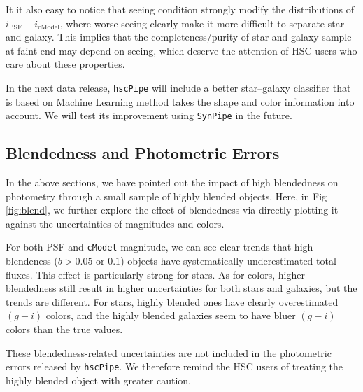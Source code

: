 \documentclass[useamsfonts]{pasj01}
\def\hscpipe{\texttt{hscPipe}}
\def\synpipe{\texttt{SynPipe}}
\def\cmodel{\texttt{cModel}}
\begin{document}
    It it also easy to notice that seeing condition strongly modify the distributions 
    of $i_{\mathrm{PSF}}-i_{\mathrm{cModel}}$, where worse seeing clearly make it 
    more difficult to separate star and galaxy.  
    This implies that the completeness/purity of star and galaxy sample at faint end
    may depend on seeing, which deserve the attention of HSC users who care about 
    these properties.      
    
    In the next data release, \hscpipe{} will include a better star--galaxy classifier
    that is based on Machine Learning method takes the shape and color information 
    into account. 
    We will test its improvement using \synpipe{} in the future.
    
\subsection{Blendedness and Photometric Errors}
    \label{ssec:blendedness}

    In the above sections, we have pointed out the impact of high blendedness on 
    photometry through a small sample of highly blended objects.  
    Here, in Fig \ref{fig:blend}, we further explore the effect of blendedness via 
    directly plotting it against the uncertainties of magnitudes and colors. 
    
    For both PSF and \cmodel{} magnitude, we can see clear trends that high-blendeness
    ($b>0.05$ or $0.1$) objects have systematically underestimated total fluxes. 
    This effect is particularly strong for stars. 
    As for colors, higher blendedness still result in higher uncertainties for both 
    stars and galaxies, but the trends are different. 
    For stars, highly blended ones have clearly overestimated $(g-i)$ colors, and the 
    highly blended galaxies seem to have bluer $(g-i)$ colors than the true values. 
    
    These blendedness-related uncertainties are not included in the photometric errors
    released by \hscpipe{}.  
    We therefore remind the HSC users of treating the highly blended object with 
    greater caution.
    
\end{document}
